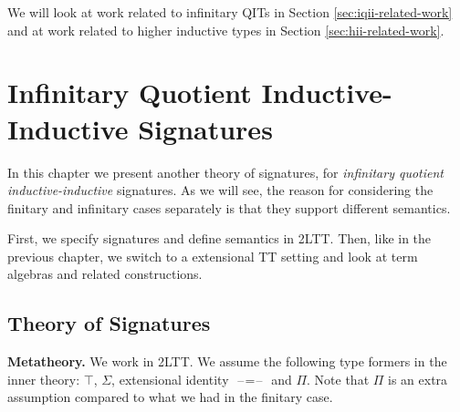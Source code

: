 \documentclass[12pt,a4paper,twoside,openany]{book}
\theoremstyle{remark}
\theoremstyle{definition}
\theoremstyle{theorem}
\newcommand{\blank}{\mathord{\hspace{1pt}\text{--}\hspace{1pt}}}
\begin{document}
We will look at work related to infinitary QITs in Section
\ref{sec:iqii-related-work} and at work related to higher inductive types in
Section \ref{sec:hii-related-work}.


\chapter[Infinitary QII Signatures]{Infinitary Quotient Inductive-Inductive Signatures}
\label{chap:iqiit}

In this chapter we present another theory of signatures, for \emph{infinitary
quotient inductive-inductive} signatures. As we will see, the reason for
considering the finitary and infinitary cases separately is that they support
different semantics.

First, we specify signatures and define semantics in 2LTT. Then, like in the
previous chapter, we switch to a extensional TT setting and look at term
algebras and related constructions.

\section{Theory of Signatures}

\textbf{Metatheory.} We work in 2LTT. We assume the following type formers in
the inner theory: $\top$, $\Sigma$, extensional identity $\blank\!=\!\blank$ and
$\Pi$. Note that $\Pi$ is an extra assumption compared to what we had in the
finitary case.
\end{document}
